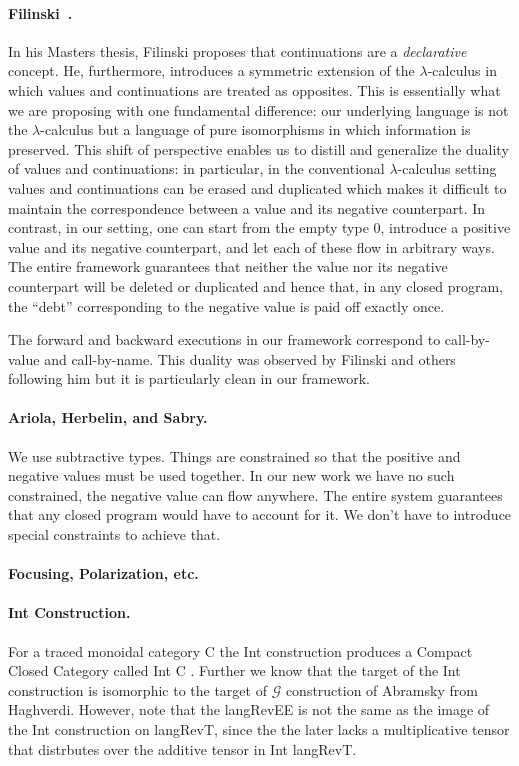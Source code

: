 \documentclass[preprint]{sigplanconf}
\newcommand{\G}{\ensuremath{\mathcal{G}}\xspace}
\begin{document}
\paragraph*{Filinski~\cite{Filinski:1989:DCI:648332.755574}.}
In his Masters thesis, Filinski proposes that continuations are a
\emph{declarative} concept. He, furthermore, introduces a symmetric extension
of the $\lambda$-calculus in which values and continuations are treated as
opposites. This is essentially what we are proposing with one fundamental
difference: our underlying language is not the $\lambda$-calculus but a
language of pure isomorphisms in which information is preserved. This shift
of perspective enables us to distill and generalize the duality of values and
continuations: in particular, in the conventional $\lambda$-calculus setting
values and continuations can be erased and duplicated which makes it
difficult to maintain the correspondence between a value and its negative
counterpart. In contrast, in our setting, one can start from the empty type
$0$, introduce a positive value and its negative counterpart, and let each of
these flow in arbitrary ways. The entire framework guarantees that neither
the value nor its negative counterpart will be deleted or duplicated and
hence that, in any closed program, the ``debt'' corresponding to the negative
value is paid off exactly once. 

The forward and backward executions in our framework correspond to
call-by-value and call-by-name. This duality was observed by Filinski and
others following him but it is particularly clean in our framework.



\paragraph*{Ariola, Herbelin, and Sabry.} We use subtractive types. Things
are constrained so that the positive and negative values must be used
together. In our new work we have no such constrained, the negative value can
flow anywhere. The entire system guarantees that any closed program would
have to account for it. We don't have to introduce special constraints to
achieve that.

\paragraph*{Focusing, Polarization, etc.}

\paragraph*{Int Construction.}
For a traced monoidal category {{C}} the Int construction produces a
Compact Closed Category called Int {{C}} \cite{joyal1996traced}.
Further we know that the target of the Int construction is isomorphic
to the target of \G construction of Abramsky \cite{Abramsky96:0} from
Haghverdi. However, note that the {{langRevEE}} is not the same as the
image of the Int construction on {{langRevT}}, since the the later
lacks a multiplicative tensor that distrbutes over the additive tensor
in Int {{langRevT}}.
\end{document}
